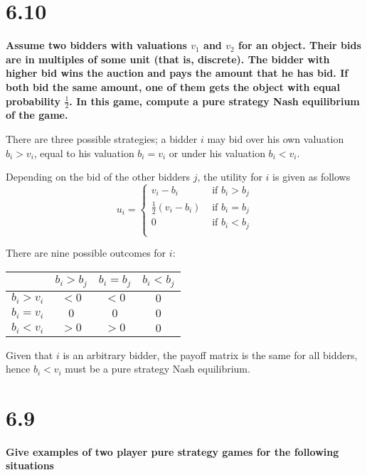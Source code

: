 
\section*{6.10}

\textbf{Assume two bidders with valuations $v_1$ and $v_2$ for an object. Their bids are in multiples of some unit (that is, discrete). The bidder with higher bid wins the auction and pays the amount that he has bid. If both bid the same amount, one of them gets the object with equal probability $\frac{1}{2}$. In this game, compute a pure strategy Nash equilibrium of the game.}

There are three possible strategies; a bidder $i$ may bid over his own valuation $b_i > v_i$, equal to his valuation $b_i = v_i$ or under his valuation $b_i < v_i$.

Depending on the bid of the other bidders $j$, the utility for $i$ is given as follows
\[
u_i =
\begin{cases}
    v_i - b_i & \text{ if } b_i > b_j \\
    \frac{1}{2}(v_i - b_i) & \text{ if } b_i = b_j \\
    0 & \text{ if } b_i < b_j \\
\end{cases}
\]

There are nine possible outcomes for $i$:
\begin{table}[H]
    \centering
    \begin{tabular}{|c|c|c|c|} \hline
         & $b_i > b_j$ & $b_i = b_j$ & $b_i < b_j$ \\ \hline
        $b_i > v_i$ & $<0$ & $<0$ & $0$ \\ \hline
        $b_i = v_i$ & $0$ & $0$ & $0$ \\ \hline
        $b_i < v_i$ & $>0$ & $>0$ & $0$ \\ \hline
    \end{tabular}
\end{table}

Given that $i$ is an arbitrary bidder, the payoff matrix is the same for all bidders, hence $b_i < v_i$ must be a pure strategy Nash equilibrium.

\section*{6.9}

\textbf{Give examples of two player pure strategy games for the following situations}

